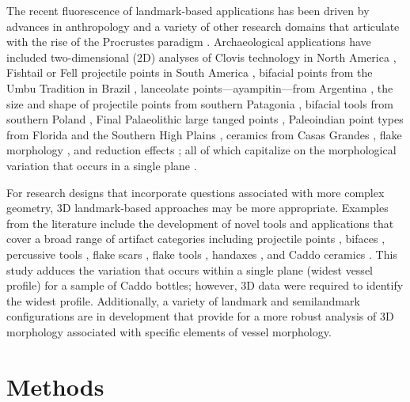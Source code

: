 \documentclass[article]{sa}
\begin{document}
The recent fluorescence of landmark-based applications has been driven by advances in anthropology \citep{RN11531,RN1770,RN306,RN1732} and a variety of other research domains \citep{RN11558,RN1743,RN1762,RN4775,RN11553,RN11535,RN11526,RN11557,RN11554,RN1646,RN11541,RN478,RN11560} that articulate with the rise of the Procrustes paradigm \citep{RN1743}. Archaeological applications have included two-dimensional (2D) analyses of Clovis technology in North America \citep{RN1754,RN1736,RN11628,RN4378,RN11625}, Fishtail or Fell projectile points in South America \citep{RN4346,RN11545}, bifacial points from the Umbu Tradition in Brazil \citep{RN11547,RN370,RN11548}, lanceolate points—ayampitin—from Argentina \citep{RN11549}, the size and shape of projectile points from southern Patagonia \citep{RN4344,RN4345}, bifacial tools from southern Poland \citep{RN11551}, Final Palaeolithic large tanged points \citep{RN4738}, Paleoindian point types from Florida \citep{RN369} and the Southern High Plains \citep{RN4358}, ceramics from Casas Grandes \citep{RN11631}, flake morphology \citep{RN4334}, and reduction effects \citep{RN4349}; all of which capitalize on the morphological variation that occurs in a single plane \citep{RN1754,RN11542}.

For research designs that incorporate questions associated with more complex geometry, 3D landmark-based approaches may be more appropriate. Examples from the literature include the development of novel tools and applications \citep{RN1722} that cover a broad range of artifact categories including projectile points \citep{RN1750,RN1755}, bifaces \citep{RN1727,RN4392,RN11550}, percussive tools \citep{RN1772}, flake scars \citep{RN4337}, flake tools \citep{RN11552}, handaxes \citep{RN1730,RN1766,RN1733,RN3145,RN335}, and Caddo ceramics \citep{RN11521,RN11716,RN1994}. This study adduces the variation that occurs within a single plane (widest vessel profile) for a sample of Caddo bottles; however, 3D data were required to identify the widest profile. Additionally, a variety of landmark and semilandmark configurations are in development that provide for a more robust analysis of 3D morphology associated with specific elements of vessel morphology.

\section*{Methods}
\end{document}
